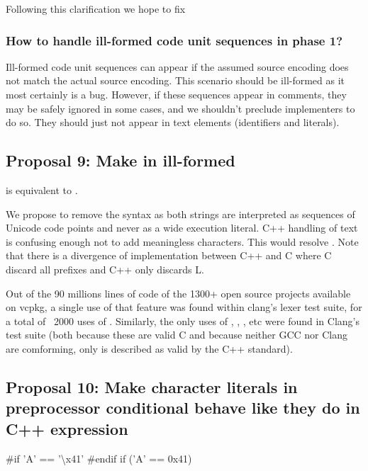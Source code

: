\documentclass{wg21}
\begin{document}
Following this clarification we hope to fix 

\subsubsection{How to handle ill-formed code unit sequences in phase 1?}

Ill-formed code unit sequences can appear if the assumed source encoding does not match the actual source encoding.
This scenario should be ill-formed as it most certainly is a bug.
However, if these sequences appear in comments, they may be safely ignored in some cases, and we shouldn't preclude implementers to do so.
They should just not appear in text elements (identifiers and literals).


\subsection{Proposal 9: Make  in  ill-formed}

 is equivalent to .

We propose to remove the  syntax as both strings are interpreted as sequences of Unicode code points and never as a wide execution literal.
C++ handling of text is confusing enough not to add meaningless characters. This would resolve .
Note that there is a divergence of implementation between C++ and C where C discard all prefixes and C++ only discards L.
 
Out of the 90 millions lines of code of the 1300+ open source projects available on vcpkg, a single use of that feature was found within clang's lexer test suite, for a total of ~2000 uses of .
Similarly, the only uses of , , , etc were found in Clang's  test suite
(both because these are valid C and because neither GCC nor Clang are comforming, only  is described as valid by the C++ standard).


\subsection{Proposal 10: Make character literals in preprocessor conditional behave like they do in C++ expression}

\begin{colorblock}
#if 'A' == '\textbackslash x41'
#endif
if ('A' == 0x41){}
\end{colorblock}
\end{document}
